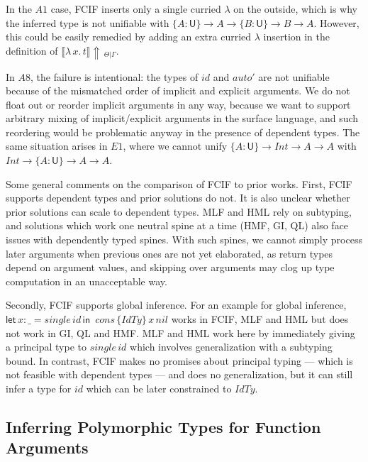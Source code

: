 \documentclass[acmsmall,review,anonymous,prologue,dvipsnames]{acmart}\settopmatter{printfolios=true,printccs=false,printacmref=false}
\newcommand{\slet}{\boldsymbol{\mathsf{let}}}
\renewcommand{\sin}{\boldsymbol{\mathsf{in}}}
\renewcommand{\U}{\mathsf{U}}
\newcommand{\einfer}[3]{\llbracket#1\rrbracket\!\Uparrow\,_{#2|#3}}
\theoremstyle{remark}
\begin{document}
In the $A1$ case, FCIF inserts only a single curried $\lambda$ on the outside,
which is why the inferred type is not unifiable with $\{A : \U\}\to A \to \{B :
\U\} \to B \to A$. However, this could be easily remedied by adding an extra
curried $\lambda$ insertion in the definition of
$\einfer{\lambda\,x.\,t}{\Theta}{\Gamma}$.

In $A8$, the failure is intentional: the types of $id$ and $auto'$ are not
unifiable because of the mismatched order of implicit and explicit arguments. We
do not float out or reorder implicit arguments in any way, because we want to
support arbitrary mixing of implicit/explicit arguments in the surface language,
and such reordering would be problematic anyway in the presence of dependent
types. The same situation arises in $E1$, where we cannot unify $\{A : \U\}\to
Int \to A \to A$ with $Int \to \{A : \U\}\to A \to A$.

Some general comments on the comparison of FCIF to prior works. First, FCIF
supports dependent types and prior solutions do not. It is also unclear whether
prior solutions can scale to dependent types. MLF and HML rely on subtyping, and
solutions which work one neutral spine at a time (HMF, GI, QL) also face issues
with dependently typed spines. With such spines, we cannot simply process later
arguments when previous ones are not yet elaborated, as return types depend on
argument values, and skipping over arguments may clog up type computation in an
unacceptable way.

Secondly, FCIF supports global inference. For an example for global inference,
$\slet\,x : \_ = single\,id\,\sin\,$ $cons\,\{IdTy\}\,x\,nil$ works in FCIF, MLF
and HML but does not work in GI, QL and HMF. MLF and HML work here by
immediately giving a principal type to $single\,id$ which involves
generalization with a subtyping bound. In contrast, FCIF makes no promises about
principal typing --- which is not feasible with dependent types --- and does no
generalization, but it can still infer a type for $id$ which can be later
constrained to $IdTy$.


\subsection{Inferring Polymorphic Types for Function Arguments}
\label{sec:appinsert}
\end{document}
